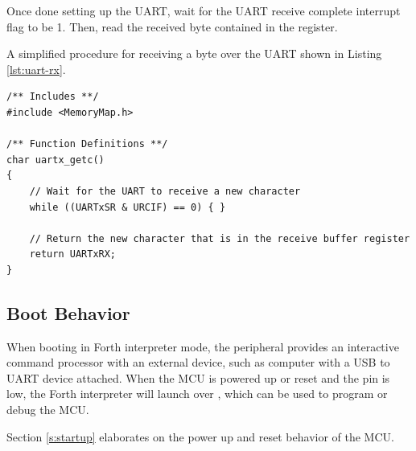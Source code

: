 Once done setting up the UART, wait for the UART receive complete interrupt flag  to be 1. Then, read the received byte contained in the  register.

A simplified procedure for receiving a byte over the UART shown in Listing \ref{lst:uart-rx}.

\begin{lstlisting}[style=customC, label=lst:uart-rx, caption={Example Function for UART Receptions}]
/** Includes **/
#include <MemoryMap.h>

/** Function Definitions **/
char uartx_getc()
{
	// Wait for the UART to receive a new character
	while ((UARTxSR & URCIF) == 0) { }
	
	// Return the new character that is in the receive buffer register
	return UARTxRX;
}
\end{lstlisting}



\subsection{ Boot Behavior}

When booting in Forth interpreter mode, the  peripheral provides an interactive command processor with an external device, such as computer with a USB to UART device attached. When the MCU is powered up or reset and the  pin is low, the Forth interpreter will launch over , which can be used to program or debug the MCU.

Section \ref{s:startup} elaborates on the power up and reset behavior of the MCU.
